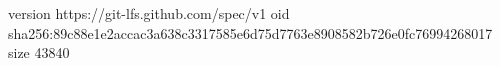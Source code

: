 version https://git-lfs.github.com/spec/v1
oid sha256:89c88e1e2accac3a638c3317585e6d75d7763e8908582b726e0fc76994268017
size 43840
